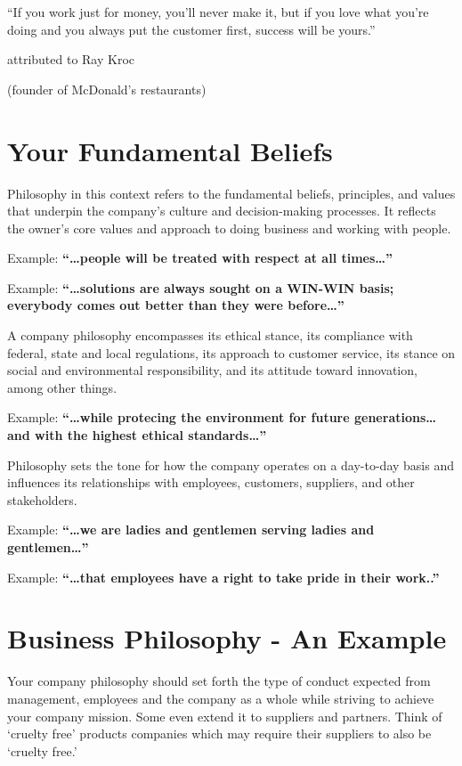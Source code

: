 \documentclass[
]{book}
\begin{document}
``If you work just for money, you'll never make it, but if you love what you're doing and you always put the customer first, success will be yours.''

attributed to Ray Kroc

(founder of McDonald's restaurants)

\hypertarget{your-fundamental-beliefs}{%
\section{Your Fundamental Beliefs}\label{your-fundamental-beliefs}}

Philosophy in this context refers to the fundamental beliefs, principles, and values that underpin the company's culture and decision-making processes. It reflects the owner's core values and approach to doing business and working with people.

{Example: \textbf{``\ldots people will be treated with respect at all times\ldots{}''}}

{Example: \textbf{``\ldots solutions are always sought on a WIN-WIN basis; everybody comes out better than they were before\ldots{}''}}

A company philosophy encompasses its ethical stance, its compliance with federal, state and local regulations, its approach to customer service, its stance on social and environmental responsibility, and its attitude toward innovation, among other things.

{Example: \textbf{``\ldots while protecing the environment for future generations\ldots and with the highest ethical standards\ldots{}''}}

Philosophy sets the tone for how the company operates on a day-to-day basis and influences its relationships with employees, customers, suppliers, and other stakeholders.

{Example: \textbf{``\ldots we are ladies and gentlemen serving ladies and gentlemen\ldots{}''}}

{Example: \textbf{``\ldots that employees have a right to take pride in their work..''}}

\hypertarget{business-philosophy---an-example}{%
\section{Business Philosophy - An Example}\label{business-philosophy---an-example}}

Your company philosophy should set forth the type of conduct expected from management, employees and the company as a whole while striving to achieve your company mission. Some even extend it to suppliers and partners. Think of `cruelty free' products companies which may require their suppliers to also be `cruelty free.'
\end{document}
